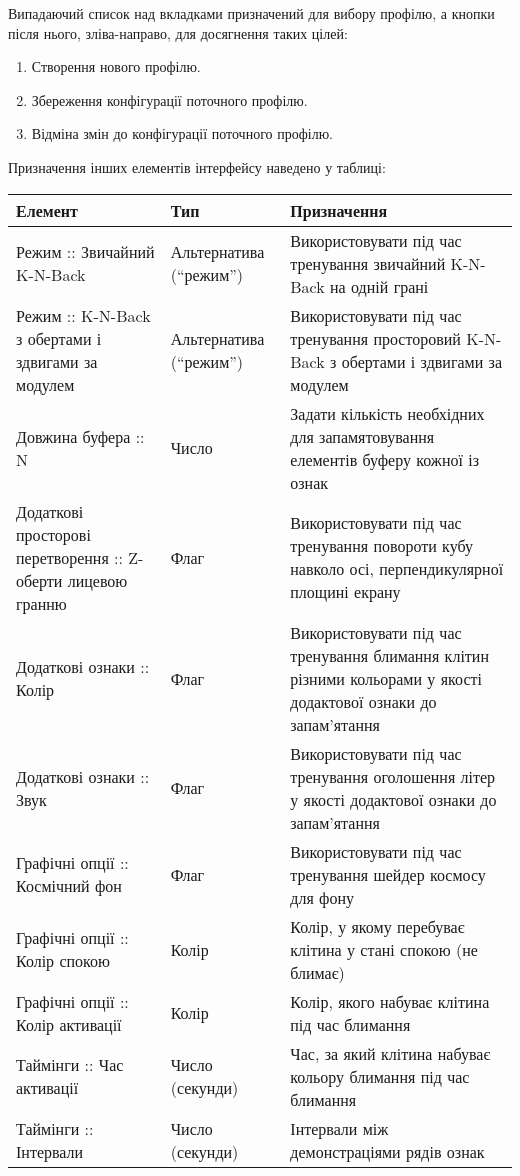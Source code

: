 Випадаючий список над вкладками призначений для вибору профілю, а кнопки після нього, зліва-направо, для досягнення таких цілей:
\begin{enumerate}
  \item Створення нового профілю.
  \item Збереження конфігурації поточного профілю.
  \item Відміна змін до конфігурації поточного профілю.
\end{enumerate}
\newpage
Призначення інших елементів інтерфейсу наведено у таблиці:
\small\begin{longtable}{| C{6cm} | C{3cm} | C{6cm} |}
  \hline
  Елемент & Тип & Призначення \\
  \hline
  Режим :: Звичайний K-N-Back
  & Альтернатива (``режим'')
  & Використовувати під час тренування звичайний K-N-Back на одній грані \\
  \hline
  Режим :: K-N-Back з обертами і здвигами за модулем
  & Альтернатива (``режим'')
  & Використовувати під час тренування просторовий K-N-Back
  з обертами і здвигами за модулем \\
  \hline
  Довжина буфера :: N
  & Число
  & Задати кількість необхідних для запамятовування
  елементів буферу кожної із ознак \\
  \hline
  Додаткові просторові перетворення :: Z-оберти лицевою гранню
  & Флаг
  & Використовувати під час тренування повороти кубу навколо осі,
  перпендикулярної площині екрану \\
  \hline
  Додаткові ознаки :: Колір
  & Флаг
  & Використовувати під час тренування блимання клітин різними кольорами
  у якості додактової ознаки до запам'ятання \\
  \hline
  Додаткові ознаки :: Звук
  & Флаг
  & Використовувати під час тренування оголошення літер
  у якості додактової ознаки до запам'ятання \\
  \hline
  Графічні опції :: Космічний фон
  & Флаг
  & Використовувати під час тренування шейдер космосу для фону \\
  \hline
  Графічні опції :: Колір спокою
  & Колір
  & Колір, у якому перебуває клітина у стані спокою (не блимає)\\
  \hline
  Графічні опції :: Колір активації
  & Колір
  & Колір, якого набуває клітина під час блимання \\
  \hline
  Таймінги :: Час активації
  & Число (секунди)
  & Час, за який клітина набуває кольору блимання під час блимання \\
  \hline
  Таймінги :: Інтервали
  & Число (секунди)
  & Інтервали між демонстраціями рядів ознак \\
  \hline
\end{longtable}\normalsize
